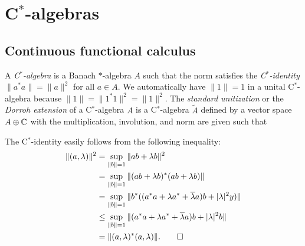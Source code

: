 \documentclass{../../large}
\begin{document}
\begin{prb}
\end{prb}







\chapter{C$^*$-algebras}

\section{Continuous functional calculus}

\begin{prb}[C$^*$-algerbas]
A \emph{C$^*$-algebra} is a Banach $*$-algebra $A$ such that the norm satisfies the \emph{C$^*$-identity} $\|a^*a\|=\|a\|^2$ for all $a\in A$.
We automatically have $\|1\|=1$ in a unital C$^*$-algebra because $\|1\|=\|1^*1\|^2=\|1\|^2$.
The \emph{standard unitization} or the \emph{Dorroh extension} of a C$^*$-algebra $A$ is a C$^*$-algebra $\tilde A$ defined by a vector space $A\oplus\C$ with the multiplication, involution, and norm are given such that
\begin{parts}
\item
\end{parts}
\end{prb}
\begin{pf}
The C$^*$-identity easily follows from the following inequality:
\begin{align*}
\|(a,\lambda)\|^2&=\sup_{\|b\|=1}\|ab+\lambda b\|^2\\
&=\sup_{\|b\|=1}\|(ab+\lambda b)^*(ab+\lambda b)\|\\
&=\sup_{\|b\|=1}\|b^*((a^*a+\lambda a^*+\bar\lambda a)b+|\lambda|^2y)\|\\
&\le\sup_{\|b\|=1}\|(a^*a+\lambda a^*+\bar\lambda a)b+|\lambda|^2b\|\\
&=\|(a,\lambda)^*(a,\lambda)\|.\qedhere
\end{align*}
\end{pf}
\end{document}
